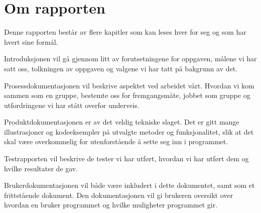\section{Om rapporten}
Denne rapporten består av flere kapitler som kan leses hver for seg og som har hvert sine formål.

Introduksjonen vil gå gjennom litt av forutsetningene for oppgaven, målene vi har satt oss, tolkningen av oppgaven og valgene vi har tatt på bakgrunn av det. 

Prosessdokumentasjonen vil beskrive aspektet ved arbeidet vårt. Hvordan vi kom sammen som en gruppe, bestemte oss for fremgangsmåte, jobbet som gruppe og utfordringene vi har stått overfor underveis.

Produktdokumentasjonen er av det veldig tekniske slaget. Det er gitt mange illustrasjoner og kodeeksempler på utvalgte metoder og funksjonalitet, slik at det skal være overkommelig for utenforstående å sette seg inn i programmet.

Testrapporten vil beskrive de tester vi har utført, hvordan vi har utført dem og hvilke resultater de gav. 

Brukerdokumentasjonen vil både være inkludert i dette dokumentet, samt som et frittstående dokument. Den dokumentasjonen vil gi brukeren oversikt over hvordan en bruker programmet og hvilke muligheter programmet gir.
